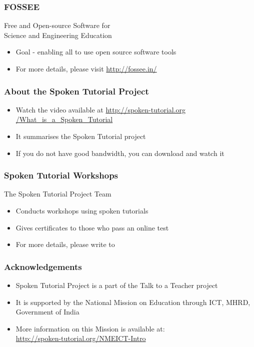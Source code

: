 \documentclass[17pt]{beamer}
\begin{document}
\begin{frame}
\frametitle{FOSSEE}
{\color{blue}Free and Open-source Software for \\Science and Engineering Education} \\
\begin{itemize}
\item Goal - enabling all to use open source software tools
\item For more details, please visit {\color{blue}\url{http://fossee.in/}}
\end{itemize}
\end{frame}
\begin{frame}
\frametitle{About the Spoken Tutorial Project}
\begin{itemize}
\item Watch the video available at {\color{blue}\url{http://spoken-tutorial.org /What\_is\_a\_Spoken\_Tutorial}} 
\item It summarises the Spoken Tutorial project 
\item If you do not have good bandwidth, you can download and watch it
\end{itemize}
\end{frame}
\begin{frame}
\frametitle{Spoken Tutorial Workshops}The Spoken Tutorial Project Team 
\begin{itemize}
\item Conducts workshops using spoken tutorials 
\item Gives certificates to those who pass an online test 
\item For more details, please write to \\ 
\end{itemize}
\end{frame}
\begin{frame}
\frametitle{Acknowledgements}
\begin{itemize}
\item Spoken Tutorial Project is a part of the Talk to a Teacher  project 
\item It is supported by the National Mission on Education through  ICT, MHRD, Government of India 
\item More information on this Mission is available at: \\{\color{blue}\url{http://spoken-tutorial.org/NMEICT-Intro}}
\end{itemize}
\end{frame}
\end{document}
